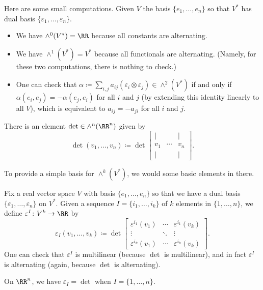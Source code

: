 \documentclass[../notes.tex]{subfiles}
\begin{document}
\begin{example}
	Here are some small computations. Given $V$ the basis $\{e_1,\ldots,e_n\}$ so that $V^*$ has dual basis $\{\varepsilon_1,\ldots,\varepsilon_n\}$.
	\begin{itemize}
		\item We have $\land^0(V^*)=\RR$ because all constants are alternating.
		\item We have $\land^1(V^*)=V^*$ because all functionals are alternating. (Namely, for these two computations, there is nothing to check.)
		\item One can check that $\alpha\coloneqq\sum_{i,j}a_{ij}(\varepsilon_i\otimes\varepsilon_j)\in\land^2(V^*)$ if and only if $\alpha(e_i,e_j)=-\alpha(e_j,e_i)$ for all $i$ and $j$ (by extending this identity linearly to all $V$), which is equivalent to $a_{ij}=-a_{ji}$ for all $i$ and $j$.
	\end{itemize}
\end{example}
\begin{example}
	There is an element $\det\in\land^n(\RR^n)$ given by
	\[\det(v_1,\ldots,v_n)\coloneqq\det\begin{bmatrix}
		| & & | \\
		v_1 & \cdots & v_n \\
		| && |
	\end{bmatrix}.\]
\end{example}
To provide a simple basis for $\land^k(V^*)$, we would some basic elements in there.
\begin{definition}
	Fix a real vector space $V$ with basis $\{e_1,\ldots,e_n\}$ so that we have a dual basis $\{\varepsilon_1,\ldots,\varepsilon_n\}$ on $V^*$. Given a sequence $I=\{i_1,\ldots,i_k\}$ of $k$ elements in $\{1,\ldots,n\}$, we define $\varepsilon^I\colon V^k\to\RR$ by
	\[\varepsilon_I(v_1,\ldots,v_k)\coloneqq\det\begin{bmatrix}
		\varepsilon^{i_1}(v_1) & \cdots & \varepsilon^{i_1}(v_k) \\
		\vdots & \ddots & \vdots \\
		\varepsilon^{i_k}(v_1) & \cdots & \varepsilon^{i_k}(v_k)
	\end{bmatrix}.\]
	One can check that $\varepsilon^I$ is multilinear (because $\det$ is multilinear), and in fact $\varepsilon^I$ is alternating (again, because $\det$ is alternating).
\end{definition}
\begin{example}
	On $\RR^n$, we have $\varepsilon_I=\det$ when $I=\{1,\ldots,n\}$.
\end{example}
\end{document}
